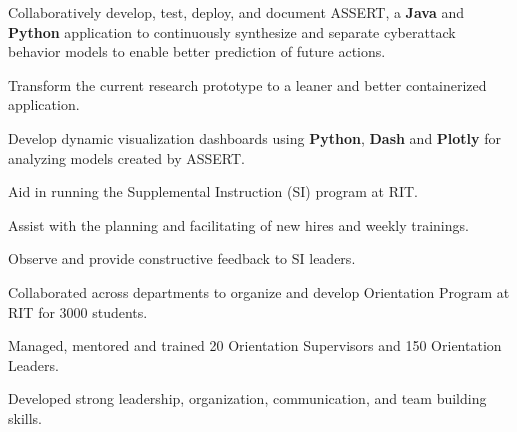 \documentclass[]{deedy-resume-openfont}
\begin{document}
\begin{minipage}[t]{0.67\textwidth}
\begin{tightemize}
  \item Collaboratively develop, test, deploy, and document ASSERT, a \textbf{Java} and \textbf{Python} application to continuously synthesize and separate cyberattack behavior models to enable better prediction of future actions.
  \item Transform the current research prototype to a leaner and better containerized application.
  \item Develop dynamic visualization dashboards using \textbf{Python}, \textbf{Dash} and \textbf{Plotly} for analyzing models created by ASSERT.
\end{tightemize}
\begin{tightemize}
  \item Aid in running the Supplemental Instruction (SI) program at RIT.
  \item Assist with the planning and facilitating of new hires and weekly trainings.
  \item Observe and provide constructive feedback to SI leaders.
\end{tightemize}
\begin{tightemize}
  \item Collaborated across departments to organize and develop Orientation Program at RIT for 3000 students.
  \item Managed, mentored and trained 20 Orientation Supervisors and 150 Orientation Leaders.
  \item Developed strong leadership, organization, communication, and team building skills.
\end{tightemize}



\end{minipage}
\end{document}
